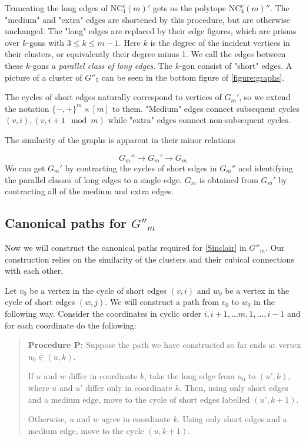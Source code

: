 \documentclass[a4paper,12pt]{book}
\theoremstyle{plain}
\theoremstyle{definition}
\newcommand\NCC{\mathrm{NC}^c}
\begin{document}
Truncating the long edges of $\NCC_4(m)'$ gets us the polytope $\NCC_4(m)''$. The "medium" and "extra" edges are shortened by this procedure, but are otherwise unchanged. The "long" edges are replaced by their edge figures, which are prisms over $k$-gons with $3 \le k \le m-1$. Here $k$ is the degree of the incident vertices in their clusters, or equivalently their degree minus 1. We call the edges between these $k$-gons a \textit{parallel class of long edges}. The $k$-gon consist of "short" edges. A picture of a cluster of $G''_5$ can be seen in the bottom figure of \ref{figure:graphs}.

The cycles of short edges naturally correspond to vertices of $G_m'$, so we extend the notation $\{-,+\}^m \times [m]$ to them. "Medium" edges connect subsequent cycles $(v,i), (v,i+1 \mod m)$ while "extra" edges connect non-subsequent cycles. 

The similarity of the graphs is apparent in their minor relations

\begin {equation}
G_m'' \rightarrow G_m' \rightarrow G_m
\end{equation}
We can get $G_m'$ by contracting the cycles of short edges in $G_m''$ and identifying the parallel classes of long edges 
to a single edge. $G_m$ is obtained from $G_m'$ by contracting all of the medium and extra edges.


\subsection{Canonical paths for $G''_m$}
\label{canpaths}

Now we will construct the canonical paths required for \ref{Sinclair} in $G''_m$. Our construction relies on the similarity
of the clusters and their cubical connections with each other.

Let $v_0$ be a vertex in the cycle of short edges $(v,i)$ and $w_0$ be a vertex in the cycle of short edges $(w,j)$. 
We will construct a path from $v_0$ to $w_0$ in the following way. Consider the coordinates in cyclic order $i, i+1, \dots m, 1, \dots,
i-1$ and for each coordinate do the following:

\begin{quote}
\textbf{Procedure P:}
Suppose the path we have constructed so far ends at vertex $u_0 \in (u,k)$.
\begin{compactitem}
\item If $u$ and $w$ differ in coordinate $k$, take the long edge from $u_0$ to $(u',k)$,
where $u$ and $u'$ differ only in coordinate $k$. Then, using only short edges and a medium edge,
move to the cycle of short edges labelled $(u', k+1)$.
\item Otherwise, $u$ and $w$ agree in coordinate $k$. Using only short edges and a medium edge,
move to the cycle $(u, k+1)$.
\end{compactitem}
\end{quote}
\end{document}
